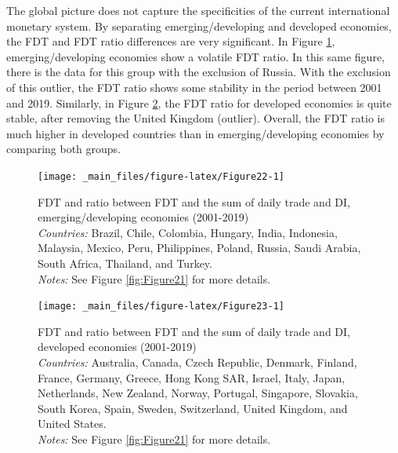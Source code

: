 \documentclass[a4paper, twoside]{templates/ociamthesis}
\begin{document}
The global picture does not capture the specificities of the current international monetary system. By separating emerging/developing and developed economies, the FDT and FDT ratio differences are very significant. In Figure \ref{fig:Figure22}, emerging/developing economies show a volatile FDT ratio. In this same figure, there is the data for this group with the exclusion of Russia. With the exclusion of this outlier, the FDT ratio shows some stability in the period between 2001 and 2019. Similarly, in Figure \ref{fig:Figure23}, the FDT ratio for developed economies is quite stable, after removing the United Kingdom (outlier). Overall, the FDT ratio is much higher in developed countries than in emerging/developing economies by comparing both groups.



\begin{figure}[!ht]

{\centering \texttt{[image: \_main\_files/figure-latex/Figure22-1]} 

}

\caption[FDT and ratio between FDT and the sum of daily trade and DI, emerging/developing economies (2001-2019)]{FDT and ratio between FDT and the sum of daily trade and DI, emerging/developing economies (2001-2019) \\ \scriptsize \textit{Countries:} Brazil, Chile, Colombia, Hungary, India, Indonesia, Malaysia, Mexico, Peru, Philippines, Poland, Russia, Saudi Arabia, South Africa, Thailand, and Turkey. \\ \scriptsize \textit{Notes:} See Figure \ref{fig:Figure21} for more details.}\label{fig:Figure22}
\end{figure}

\begin{figure}[!ht]

{\centering \texttt{[image: \_main\_files/figure-latex/Figure23-1]} 

}

\caption[FDT and ratio between FDT and the sum of daily trade and DI, developed economies (2001-2019)]{FDT and ratio between FDT and the sum of daily trade and DI, developed economies (2001-2019) \\ \scriptsize \textit{Countries:} Australia, Canada, Czech Republic, Denmark, Finland, France, Germany, Greece, Hong Kong SAR, Israel, Italy, Japan, Netherlands, New Zealand, Norway, Portugal, Singapore, Slovakia, South Korea, Spain, Sweden, Switzerland, United Kingdom, and United States. \\ \scriptsize \textit{Notes:} See Figure \ref{fig:Figure21} for more details.}\label{fig:Figure23}
\end{figure}
\end{document}
